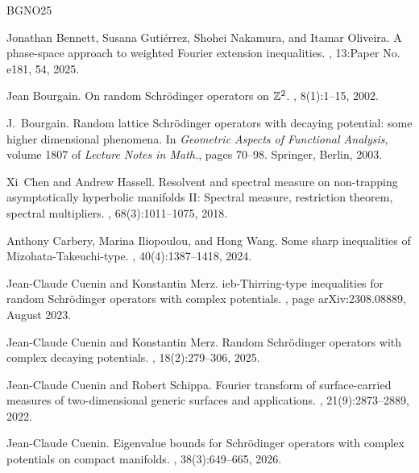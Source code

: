 \documentclass[12pt,reqno]{amsart}
\theoremstyle{definition}
\theoremstyle{remark}
\numberwithin{equation}{section}
\newcommand{\1}{\mathbbm{1}}
\begin{document}
\def\cprime{$'$}
\begin{thebibliography}{BGNO25}

Jonathan Bennett, Susana Guti\'{e}rrez, Shohei Nakamura, and Itamar Oliveira.
\newblock A phase-space approach to weighted {F}ourier extension inequalities.
, 13:Paper No. e181, 54, 2025.

Jean Bourgain.
\newblock On random {S}chr\"{o}dinger operators on {$\Bbb Z^2$}.
, 8(1):1--15, 2002.

J.~Bourgain.
\newblock Random lattice {S}chr\"{o}dinger operators with decaying potential:
  some higher dimensional phenomena.
\newblock In {\em Geometric Aspects of Functional Analysis}, volume 1807 of
  {\em Lecture Notes in Math.}, pages 70--98. Springer, Berlin, 2003.

Xi~Chen and Andrew Hassell.
\newblock Resolvent and spectral measure on non-trapping asymptotically
  hyperbolic manifolds {II}: {S}pectral measure, restriction theorem, spectral
  multipliers.
, 68(3):1011--1075, 2018.

Anthony Carbery, Marina Iliopoulou, and Hong Wang.
\newblock Some sharp inequalities of {M}izohata-{T}akeuchi-type.
, 40(4):1387--1418, 2024.

Jean-Claude {Cuenin} and Konstantin {Merz}.
ieb-{T}hirring-type inequalities for random {S}chr\"{o}dinger
  operators with complex potentials.
,
  page arXiv:2308.08889, August 2023.

Jean-Claude Cuenin and Konstantin Merz.
\newblock Random {S}chr\"{o}dinger operators with complex decaying potentials.
, 18(2):279--306, 2025.

Jean-Claude Cuenin and Robert Schippa.
\newblock Fourier transform of surface-carried measures of two-dimensional
  generic surfaces and applications.
, 21(9):2873--2889, 2022.

Jean-Claude Cuenin.
\newblock Eigenvalue bounds for {S}chr\"{o}dinger operators with complex
  potentials on compact manifolds.
, 38(3):649--665, 2026.


\end{thebibliography}
\end{document}
